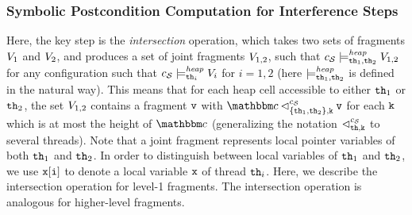\subsubsection{Symbolic Postcondition Computation for Interference Steps} 
Here, the key step is the {\em intersection} operation, which
takes two sets of fragments
$V_1$ and $V_2$, and produces a set of joint fragments
$V_{1,2}$, such that
$c_{\mathcal S} \models_{{\tt th}_1,{\tt th}_2}^{\mathit{heap}} V_{1,2}$ for any configuration
such that
$c_{\mathcal S} \models_{{\tt th}_i}^{\mathit{heap}} V_i$ for $i=1,2$
(here $\models_{{\tt th}_1,{\tt th}_2}^{\mathit{heap}}$ is defined in the natural way).
This means that for each heap cell accessible to either
${\tt th}_1$ or ${\tt th}_2$, the set $V_{1,2}$ 
contains a fragment $\mathtt{v}$ with $\cell \lsatfrag{\klevel}{\{\thread_1,\thread_2\}}{\sconf} \frag$ for each ${\tt k}$ which is at most the height of $\cell$
(generalizing the notation  $\lhd_{{\tt th},{\tt k}}^{c_{\mathcal S}}$ to several
threads).
Note that a joint fragment represents local pointer variables of
both ${\tt th}_1$ and ${\tt th}_2$. In order to distinguish
between local variables of ${\tt th}_1$ and ${\tt th}_2$, we use $\mathtt{x[i]}$
to denote a local variable $\mathtt{x}$ of thread ${\tt th}_i$.
Here, we describe the intersection operation for level-1 fragments. The
intersection operation is analogous for higher-level fragments.

